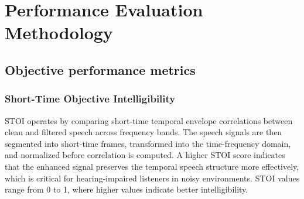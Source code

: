 


\section{Performance Evaluation Methodology}
\subsection{Objective performance metrics}
\subsubsection{Short-Time Objective Intelligibility} 
STOI operates by comparing short-time temporal envelope correlations between clean and filtered speech across frequency bands. The speech signals are then segmented into short-time frames, transformed into the time-frequency domain, and normalized before correlation is computed. A higher STOI score indicates that the enhanced signal preserves the temporal speech structure more effectively, which is critical for hearing-impaired listeners in noisy environments. 
STOI values range from 0 to 1, where higher values indicate better intelligibility. 

